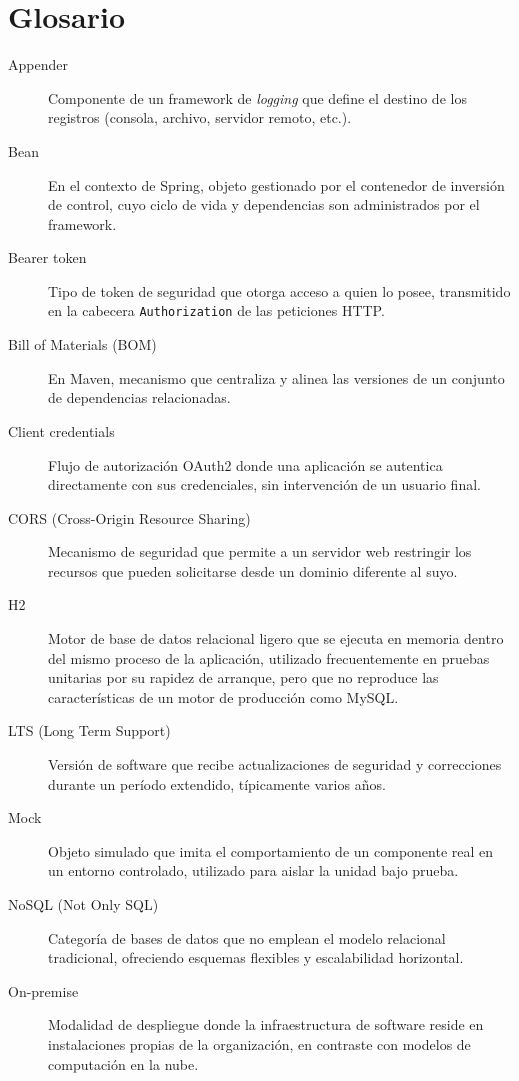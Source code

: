 \chapter*{Glosario}

\begin{description}
    \item[Appender] Componente de un framework de \textit{logging} que define el destino de los registros (consola, archivo, servidor remoto, etc.).
    \item[Bean] En el contexto de Spring, objeto gestionado por el contenedor de inversión de control, cuyo ciclo de vida y dependencias son administrados por el framework.
    \item[Bearer token] Tipo de token de seguridad que otorga acceso a quien lo posee, transmitido en la cabecera \texttt{Authorization} de las peticiones HTTP.
    \item[Bill of Materials (BOM)] En Maven, mecanismo que centraliza y alinea las versiones de un conjunto de dependencias relacionadas.
    \item[Client credentials] Flujo de autorización OAuth2 donde una aplicación se autentica directamente con sus credenciales, sin intervención de un usuario final.
    \item[CORS (Cross-Origin Resource Sharing)] Mecanismo de seguridad que permite a un servidor web restringir los recursos que pueden solicitarse desde un dominio diferente al suyo.
    \item[H2] Motor de base de datos relacional ligero que se ejecuta en memoria dentro del mismo proceso de la aplicación, utilizado frecuentemente en pruebas unitarias por su rapidez de arranque, pero que no reproduce las características de un motor de producción como MySQL.
    \item[LTS (Long Term Support)] Versión de software que recibe actualizaciones de seguridad y correcciones durante un período extendido, típicamente varios años.
    \item[Mock] Objeto simulado que imita el comportamiento de un componente real en un entorno controlado, utilizado para aislar la unidad bajo prueba.
    \item[NoSQL (Not Only SQL)] Categoría de bases de datos que no emplean el modelo relacional tradicional, ofreciendo esquemas flexibles y escalabilidad horizontal.
    \item[On-premise] Modalidad de despliegue donde la infraestructura de software reside en instalaciones propias de la organización, en contraste con modelos de computación en la nube.

\end{description}
